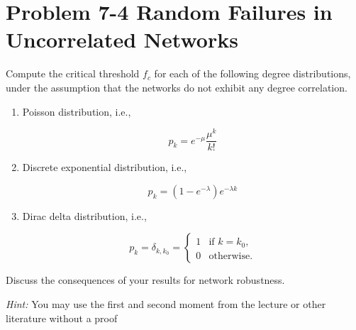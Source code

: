 \section{Problem 7-4 Random Failures in Uncorrelated Networks}

Compute the critical threshold $f_c$ for each of the following degree distributions, under the assumption that the
networks do not exhibit any degree correlation.

\begin{enumerate}
	\item Poisson distribution, i.e.,
	
	\begin{equation*}
		p_k = e^{-\mu}\frac{\mu^k}{k!}
	\end{equation*}

	\item Discrete exponential distribution, i.e.,
	
	\begin{equation*}
		p_k = (1 - e^{-\lambda})e^{-\lambda k}
	\end{equation*}

	\item Dirac delta distribution, i.e.,
	
	\begin{equation*}
		p_k = \delta_{k,k_0} = 
		\begin{cases}
			1 & \text{if $k = k_0$,} \\
			0 & \text{otherwise.}
		\end{cases}
	\end{equation*}

\end{enumerate}

Discuss the consequences of your results for network robustness.

\textit{Hint:} You may use the first and second moment from the lecture or other literature without a proof